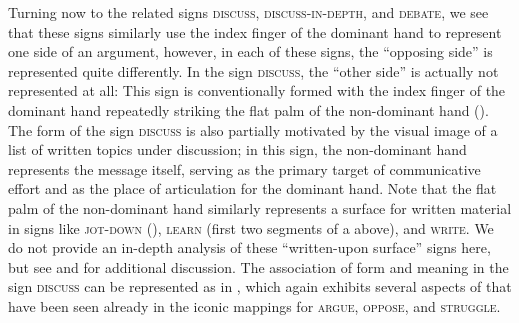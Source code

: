\documentclass[output=paper,
modfonts
]{LSP/langsci}
\begin{document}
\begin{table}
\caption{Aspects of the iconic  for \textsc{struggle}.}
\label{tab:7lp}
\end{table}

  Turning now to the related signs \textsc{discuss}, \textsc{discuss-in-depth}, and \textsc{debate}, we see that these signs similarly use the index finger of the dominant hand to represent one side of an argument, however, in each of these signs, the ``opposing side'' is represented quite differently. In the sign \textsc{discuss}, the ``other side'' is actually not represented at all: This sign\textsc{} is conventionally formed with the index finger of the dominant hand repeatedly striking the flat palm of the non-dominant hand (). The form of the sign \textsc{discuss} is also partially motivated by the visual image of a list of written topics under discussion; in this sign, the non-dominant hand represents the message itself, serving as the primary target of communicative effort and as the place of articulation for the dominant hand. Note that the flat palm of the non-dominant hand similarly represents a surface for written material in signs like \textsc{jot-down} (), \textsc{learn} (first two segments of a above), and \textsc{write}. We do not provide an in-depth analysis of these ``written-upon surface'' signs here, but see \citet[118]{Frishberg1973} and \citet[75]{Aronoff2003} for additional discussion. The association of form and meaning in the sign \textsc{discuss} can be represented as in , which again exhibits several aspects of  that have been seen already in the iconic mappings for \textsc{argue, oppose}, and \textsc{struggle}.
  
\end{document}
